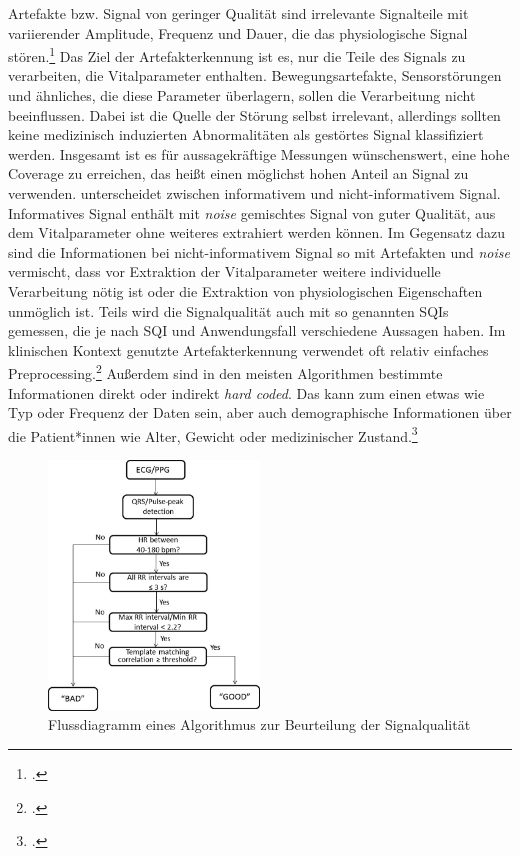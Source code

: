 	Artefakte bzw. Signal von geringer Qualität sind irrelevante Signalteile mit variierender Amplitude, Frequenz und Dauer, die das physiologische Signal stören.\footcite[Vgl.][]{Nizami2013} Das Ziel der Artefakterkennung ist es, nur die Teile des Signals zu verarbeiten, die Vitalparameter enthalten. Bewegungsartefakte, Sensorstörungen und ähnliches, die diese Parameter überlagern, sollen die Verarbeitung nicht beeinflussen. Dabei ist die Quelle der Störung selbst irrelevant, allerdings sollten keine medizinisch induzierten Abnormalitäten als gestörtes Signal klassifiziert werden. Insgesamt ist es für aussagekräftige Messungen wünschenswert, eine hohe Coverage zu erreichen, das heißt einen möglichst hohen Anteil an Signal zu verwenden. \citeauthor{Sadek2016} unterscheidet zwischen informativem und nicht-informativem Signal. Informatives Signal enthält mit \textit{noise} gemischtes Signal von guter Qualität, aus dem Vitalparameter ohne weiteres extrahiert werden können. Im Gegensatz dazu sind die Informationen bei nicht-informativem Signal so mit Artefakten und \textit{noise} vermischt, dass vor Extraktion der Vitalparameter weitere individuelle Verarbeitung nötig ist oder die Extraktion von physiologischen Eigenschaften unmöglich ist. Teils wird die Signalqualität auch mit so genannten \acp{SQI} gemessen, die je nach \ac{SQI} und Anwendungsfall verschiedene Aussagen haben. Im klinischen Kontext genutzte Artefakterkennung verwendet oft relativ einfaches Preprocessing.\footcite[Vgl.][]{Nizami2013} Außerdem sind in den meisten Algorithmen bestimmte Informationen direkt oder indirekt \textit{hard coded}. Das kann zum einen etwas wie Typ oder Frequenz der Daten sein, aber auch demographische Informationen über die Patient*innen wie Alter, Gewicht oder medizinischer Zustand.\footcite[Vgl.][]{Nizami2013}
		
	\begin{figure}[H]
		\centering
		\includegraphics[width=0.5\textwidth]{pic/ad_flussdiagramm}
		\caption[Flussdiagramm eines Algorithmus zur Beurteilung der Signalqualität]{Flussdiagramm eines Algorithmus zur Beurteilung der Signalqualität\protect\footnotemark}
		\label{fig:ecg-ad}
	\end{figure}
	
